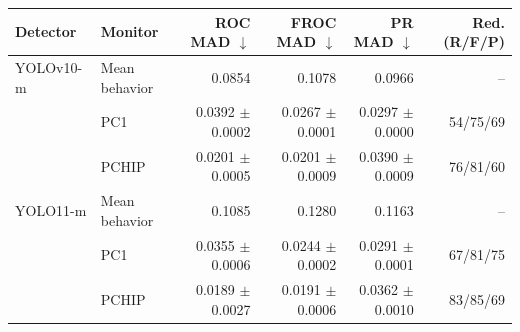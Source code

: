 \begin{tabular}{llrrrr}
\toprule
Detector & Monitor & ROC MAD $\downarrow$ & FROC MAD $\downarrow$ & PR MAD $\downarrow$ & Red. (R/F/P) \\
\midrule
YOLOv10-m & Mean behavior & 0.0854 & 0.1078 & 0.0966 & -- \\
 & PC1 & 0.0392 $\pm$ 0.0002 & 0.0267 $\pm$ 0.0001 & 0.0297 $\pm$ 0.0000 & 54/75/69 \\
 & PCHIP & 0.0201 $\pm$ 0.0005 & 0.0201 $\pm$ 0.0009 & 0.0390 $\pm$ 0.0009 & 76/81/60 \\
\midrule
YOLO11-m & Mean behavior & 0.1085 & 0.1280 & 0.1163 & -- \\
 & PC1 & 0.0355 $\pm$ 0.0006 & 0.0244 $\pm$ 0.0002 & 0.0291 $\pm$ 0.0001 & 67/81/75 \\
 & PCHIP & 0.0189 $\pm$ 0.0027 & 0.0191 $\pm$ 0.0006 & 0.0362 $\pm$ 0.0010 & 83/85/69 \\
\bottomrule
\end{tabular}
